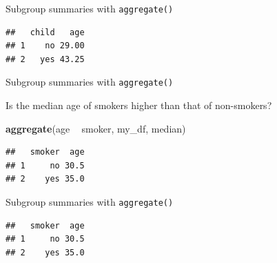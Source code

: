 \documentclass[ignorenonframetext,]{beamer}
\newenvironment{Shaded}{\begin{snugshade}}{\end{snugshade}}
\newcommand{\DataTypeTok}[1]{\textcolor[rgb]{0.13,0.29,0.53}{#1}}
\newcommand{\KeywordTok}[1]{\textcolor[rgb]{0.13,0.29,0.53}{\textbf{#1}}}
\newcommand{\NormalTok}[1]{#1}
\newcommand{\OperatorTok}[1]{\textcolor[rgb]{0.81,0.36,0.00}{\textbf{#1}}}
\newcommand{\StringTok}[1]{\textcolor[rgb]{0.31,0.60,0.02}{#1}}
\begin{document}
\begin{frame}[fragile]{Subgroup summaries with \texttt{aggregate()}}
\protect\hypertarget{subgroup-summaries-with-aggregate-12}{}

\begin{Shaded}
\end{Shaded}

\begin{verbatim}
##   child   age
## 1    no 29.00
## 2   yes 43.25
\end{verbatim}

\end{frame}

\begin{frame}[fragile]{Subgroup summaries with \texttt{aggregate()}}
\protect\hypertarget{subgroup-summaries-with-aggregate-13}{}

Is the median age of smokers higher than that of non-smokers?

\begin{Shaded}
\begin{Highlighting}[]
\KeywordTok{aggregate}\NormalTok{(age }\OperatorTok{~}\StringTok{ }\NormalTok{smoker, my_df, median)}
\end{Highlighting}
\end{Shaded}

\begin{verbatim}
##   smoker  age
## 1     no 30.5
## 2    yes 35.0
\end{verbatim}

\end{frame}

\begin{frame}[fragile]{Subgroup summaries with \texttt{aggregate()}}
\protect\hypertarget{subgroup-summaries-with-aggregate-14}{}

\begin{Shaded}
\end{Shaded}

\begin{verbatim}
##   smoker  age
## 1     no 30.5
## 2    yes 35.0
\end{verbatim}

\end{frame}
\end{document}
